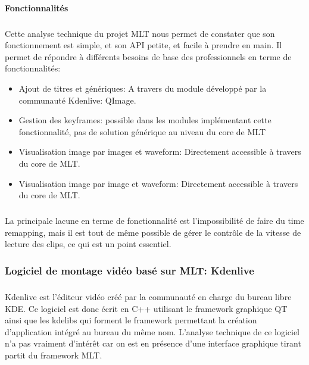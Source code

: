\paragraph{Fonctionnalités}

\subparagraph{ }

Cette analyse technique du projet MLT nous permet de constater
que son fonctionnement est simple, et son API petite, et facile à
prendre en main.  Il permet de répondre à différents besoins de base
des professionnels en terme de fonctionnalités:

\begin{itemize}

  \item {Ajout de titres et génériques: A travers du module développé
  par la
    communauté Kdenlive: QImage.}

  \item {Gestion des keyframes: possible dans les modules implémentant
    cette fonctionnalité, pas de solution générique au niveau du core
    de MLT}

  \item {Visualisation image par images et waveform: Directement
  accessible à
    travers du core de MLT.}

  \item {Visualisation image par image et waveform: Directement
  accessible à
    travers du core de MLT.}

\end{itemize}

\subparagraph{}

La principale lacune en terme de fonctionnalité est l'impossibilité de
faire du time remapping, mais il est tout de même possible de gérer
le contrôle de la vitesse de lecture des clips, ce qui est un point
essentiel.

\subsubsection {Logiciel de montage vidéo basé sur MLT:
Kdenlive}

\subparagraph{}

Kdenlive est l'éditeur vidéo créé par la communauté en charge
du bureau libre KDE. Ce logiciel est donc écrit en C++ utilisant le
framework graphique QT  ainsi que les kdelibs qui forment le framework
permettant la création d'application intégré au bureau du même nom.
L'analyse technique de ce logiciel n'a pas vraiment d'intérêt car on
est en présence d'une interface graphique tirant partit du framework
MLT.

